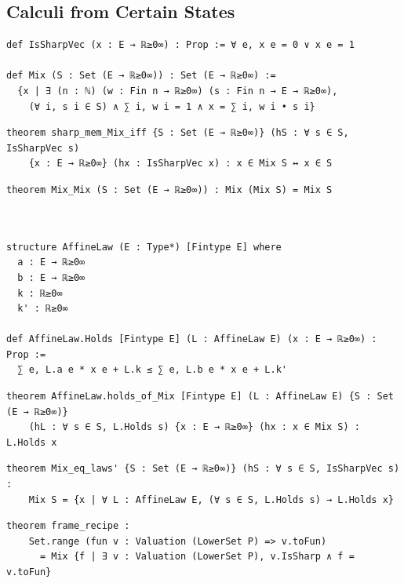 \subsection{Calculi from Certain States}

\label{lean:mix}
\begin{lstlisting}
def IsSharpVec (x : E → ℝ≥0∞) : Prop := ∀ e, x e = 0 ∨ x e = 1

def Mix (S : Set (E → ℝ≥0∞)) : Set (E → ℝ≥0∞) :=
  {x | ∃ (n : ℕ) (w : Fin n → ℝ≥0∞) (s : Fin n → E → ℝ≥0∞),
    (∀ i, s i ∈ S) ∧ ∑ i, w i = 1 ∧ x = ∑ i, w i • s i}
\end{lstlisting}

\label{lean:sharp-mem-mix-iff}
\begin{lstlisting}
theorem sharp_mem_Mix_iff {S : Set (E → ℝ≥0∞)} (hS : ∀ s ∈ S, IsSharpVec s)
    {x : E → ℝ≥0∞} (hx : IsSharpVec x) : x ∈ Mix S ↔ x ∈ S
\end{lstlisting}

\label{lean:mix-mix}
\begin{lstlisting}
theorem Mix_Mix (S : Set (E → ℝ≥0∞)) : Mix (Mix S) = Mix S
\end{lstlisting}

\label{lean:affinelaw}
\begin{lstlisting}


structure AffineLaw (E : Type*) [Fintype E] where
  a : E → ℝ≥0∞
  b : E → ℝ≥0∞
  k : ℝ≥0∞
  k' : ℝ≥0∞

def AffineLaw.Holds [Fintype E] (L : AffineLaw E) (x : E → ℝ≥0∞) : Prop :=
  ∑ e, L.a e * x e + L.k ≤ ∑ e, L.b e * x e + L.k'
\end{lstlisting}

\label{lean:affinelaw-holds-of-mix}
\begin{lstlisting}
theorem AffineLaw.holds_of_Mix [Fintype E] (L : AffineLaw E) {S : Set (E → ℝ≥0∞)}
    (hL : ∀ s ∈ S, L.Holds s) {x : E → ℝ≥0∞} (hx : x ∈ Mix S) : L.Holds x
\end{lstlisting}

\label{lean:mix-eq-laws}
\begin{lstlisting}
theorem Mix_eq_laws' {S : Set (E → ℝ≥0∞)} (hS : ∀ s ∈ S, IsSharpVec s) :
    Mix S = {x | ∀ L : AffineLaw E, (∀ s ∈ S, L.Holds s) → L.Holds x}
\end{lstlisting}

\label{lean:frame-recipe}
\begin{lstlisting}
theorem frame_recipe :
    Set.range (fun v : Valuation (LowerSet P) => v.toFun)
      = Mix {f | ∃ v : Valuation (LowerSet P), v.IsSharp ∧ f = v.toFun}
\end{lstlisting}

